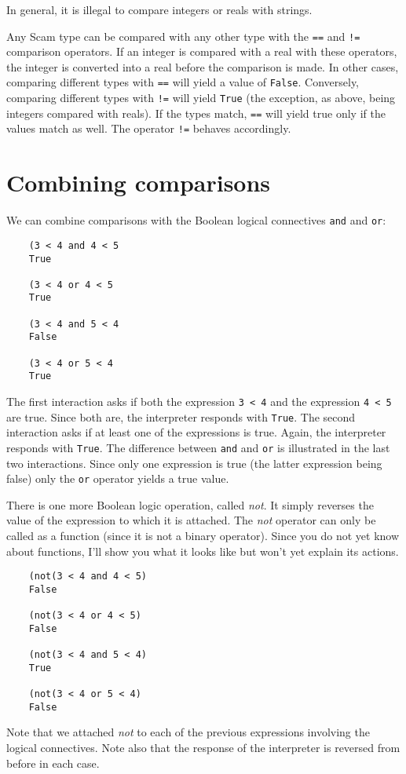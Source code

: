 In general, it is illegal
to compare integers or reals with strings.

Any Scam type can be compared with any other type with the
{\tt ==}
and
{\tt !=}
comparison operators.
If an integer is compared with a real with these
operators, the integer is converted into a real before the comparison
is made. In other cases, comparing different types with
{\tt ==}
will yield
a value of {\tt False}. Conversely, comparing different types with
{\tt !=}
will yield
{\tt True}
(the exception, as above, being integers compared with reals).
If the types match,
{\tt ==}
will yield true only if the values
match as well. The operator
{\tt !=}
behaves accordingly.

\section{Combining comparisons}

We can combine comparisons with the {\sc Boolean} logical connectives
{\tt and} and {\tt or}:

\begin{verbatim}
    (3 < 4 and 4 < 5
    True
    
    (3 < 4 or 4 < 5
    True
    
    (3 < 4 and 5 < 4
    False
    
    (3 < 4 or 5 < 4
    True
\end{verbatim}

The first interaction asks if both the expression
{\tt 3 < 4} and the expression
{\tt 4 < 5} are true. Since both are, the
interpreter responds with {\tt True}. The second interaction
asks if at least one of the expressions is true. Again, the
interpreter responds with {\tt True}. The difference between {\tt and}
and {\tt or} is illustrated in the last two interactions. Since
only one expression is true (the latter expression being
false) only the {\tt or} operator yields a true value.

There is one more {\sc Boolean} logic operation, called
{\it not}. It simply reverses the value of the expression
to which it is attached. The {\it not} operator can only be called
as a function (since it is not a binary operator). Since
you do not yet know about functions, I'll show you what
it looks like but won't yet explain its actions.

\begin{verbatim}
    (not(3 < 4 and 4 < 5)
    False
    
    (not(3 < 4 or 4 < 5)
    False
    
    (not(3 < 4 and 5 < 4)
    True
    
    (not(3 < 4 or 5 < 4)
    False
\end{verbatim}

Note that we attached {\it not} to each of the previous expressions involving
the logical connectives. Note also that the response of the interpreter
is reversed from before in each case.
